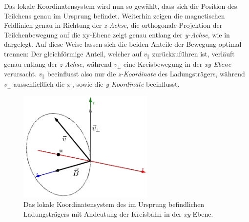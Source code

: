 Das lokale Koordinatensystem wird nun so gew\"ahlt, dass sich die Position des Teilchens genau im Ursprung befindet.
Weiterhin zeigen die magnetischen
Feldlinien genau in Richtung der \textit{z-Achse}, die orthogonale Projektion der Teilchenbewegung auf die xy-Ebene zeigt genau
entlang der \textit{y-Achse}, wie in  dargelegt. Auf diese Weise lassen sich die beiden Anteile der
Bewegung optimal trennen: Der gleichf\"ormige Anteil, welcher auf \(v_\parallel\) zur\"uckzuf\"uhren ist,
verl\"auft genau entlang der \textit{z-Achse}, w\"ahrend \(v_\perp\) eine Kreisbewegung in der \textit{xy-Ebene} verursacht.
\(v_\parallel\) beeinflusst also nur die \textit{z-Koordinate} des Ladungstr\"agers, w\"ahrend \(v_\perp\) ausschlie{\ss}lich die
\textit{x}-, sowie die \textit{y-Koordinate} beeinflusst.

\begin{figure}
  \centering
  \includegraphics[width=0.6\textwidth]{../geogebra/img/local_movement_edited}
  \caption{Das lokale Koordinatensystem des im Ursprung befindlichen Ladungstr\"agers mit Andeutung der Kreisbahn in der
    \textit{xy}-Ebene.}
  \label{fig:locale_movement}
\end{figure}

